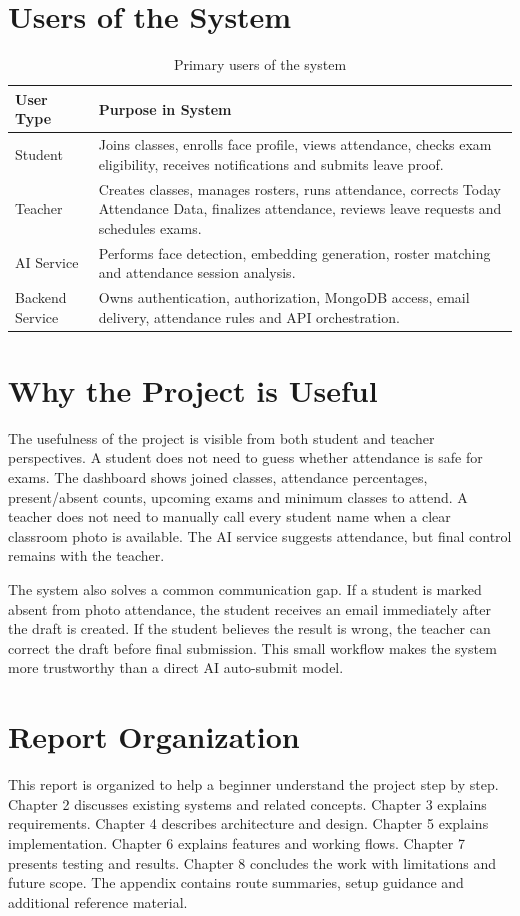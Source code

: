 \section{Users of the System}
\begin{table}[H]
\centering
\caption{Primary users of the system}
\label{tab:users}
\begin{tabularx}{\textwidth}{p{3.2cm}X}
\toprule
\textbf{User Type} & \textbf{Purpose in System}\\
\midrule
Student & Joins classes, enrolls face profile, views attendance, checks exam eligibility, receives notifications and submits leave proof.\\
Teacher & Creates classes, manages rosters, runs attendance, corrects Today Attendance Data, finalizes attendance, reviews leave requests and schedules exams.\\
AI Service & Performs face detection, embedding generation, roster matching and attendance session analysis.\\
Backend Service & Owns authentication, authorization, MongoDB access, email delivery, attendance rules and API orchestration.\\
\bottomrule
\end{tabularx}
\end{table}

\section{Why the Project is Useful}
The usefulness of the project is visible from both student and teacher perspectives. A student does not need to guess whether attendance is safe for exams. The dashboard shows joined classes, attendance percentages, present/absent counts, upcoming exams and minimum classes to attend. A teacher does not need to manually call every student name when a clear classroom photo is available. The AI service suggests attendance, but final control remains with the teacher.

The system also solves a common communication gap. If a student is marked absent from photo attendance, the student receives an email immediately after the draft is created. If the student believes the result is wrong, the teacher can correct the draft before final submission. This small workflow makes the system more trustworthy than a direct AI auto-submit model.

\section{Report Organization}
This report is organized to help a beginner understand the project step by step. Chapter 2 discusses existing systems and related concepts. Chapter 3 explains requirements. Chapter 4 describes architecture and design. Chapter 5 explains implementation. Chapter 6 explains features and working flows. Chapter 7 presents testing and results. Chapter 8 concludes the work with limitations and future scope. The appendix contains route summaries, setup guidance and additional reference material.

